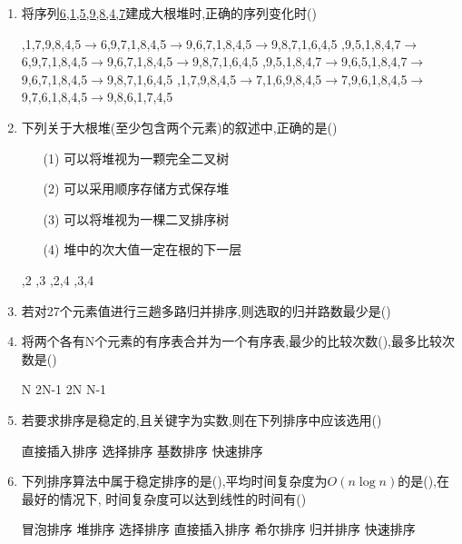 \documentclass[12pt, a4paper, oneside, UTF8]{ctexbook}
\begin{document}
\begin{enumerate}
    \item 将序列\underline{6,1,5,9,8,4,7}建成大根堆时,正确的序列变化时() 
    \begin{choices}[1]
        ,1,7,9,8,4,5$\rightarrow$6,9,7,1,8,4,5$\rightarrow$9,6,7,1,8,4,5$\rightarrow$9,8,7,1,6,4,5
        ,9,5,1,8,4,7$\rightarrow$6,9,7,1,8,4,5$\rightarrow$9,6,7,1,8,4,5$\rightarrow$9,8,7,1,6,4,5
        ,9,5,1,8,4,7$\rightarrow$9,6,5,1,8,4,7$\rightarrow$9,6,7,1,8,4,5$\rightarrow$9,8,7,1,6,4,5
        ,1,7,9,8,4,5$\rightarrow$7,1,6,9,8,4,5$\rightarrow$7,9,6,1,8,4,5$\rightarrow$9,7,6,1,8,4,5$\rightarrow$9,8,6,1,7,4,5
    \end{choices}

    \item 下列关于大根堆(至少包含两个元素)的叙述中,正确的是()
    \begin{enumerate}
        \item [(1)]可以将堆视为一颗完全二叉树
        \item [(2)]可以采用顺序存储方式保存堆
        \item [(3)]可以将堆视为一棵二叉排序树
        \item [(4)]堆中的次大值一定在根的下一层
    \end{enumerate}
    \begin{choices}
        ,2
        ,3
        ,2,4
        ,3,4
    \end{choices}

    \item 若对27个元素值进行三趟多路归并排序,则选取的归并路数最少是() 
    \begin{choices}
    \end{choices}

    \item 将两个各有N个元素的有序表合并为一个有序表,最少的比较次数(),最多比较次数是() 
    \begin{choices}
        \task N 
        \task 2N-1 
        \task 2N 
        \task N-1 
    \end{choices}

    \item 若要求排序是稳定的,且关键字为实数,则在下列排序中应该选用() 
    \begin{choices}
        \task 直接插入排序
        \task 选择排序
        \task 基数排序
        \task 快速排序 
    \end{choices}

    \item 下列排序算法中属于稳定排序的是(),平均时间复杂度为$O(n\log{n})$的是(),在最好的情况下,
    时间复杂度可以达到线性的时间有() 
    \begin{choices}[4]
        \task 冒泡排序
        \task 堆排序
        \task 选择排序 
        \task 直接插入排序 
        \task 希尔排序 
        \task 归并排序 
        \task 快速排序
    \end{choices}


\end{enumerate}
\end{document}
